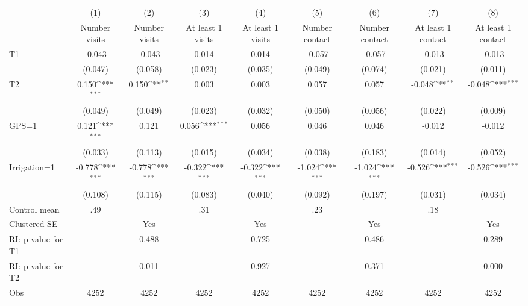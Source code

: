 {
\def\sym#1{\ifmmode^{#1}\else\(^{#1}\)\fi}
\begin{tabular}{l*{8}{c}}
\hline\hline
                    &\multicolumn{1}{c}{(1)}         &\multicolumn{1}{c}{(2)}         &\multicolumn{1}{c}{(3)}         &\multicolumn{1}{c}{(4)}         &\multicolumn{1}{c}{(5)}         &\multicolumn{1}{c}{(6)}         &\multicolumn{1}{c}{(7)}         &\multicolumn{1}{c}{(8)}         \\
                    &Number visits         &Number visits         &At least 1 visits         &At least 1 visits         &Number contact         &Number contact         &At least 1 contact         &At least 1 contact         \\
\hline
T1                  &-0.043         &-0.043         &0.014         &0.014         &-0.057         &-0.057         &-0.013         &-0.013         \\
                    &(0.047)         &(0.058)         &(0.023)         &(0.035)         &(0.049)         &(0.074)         &(0.021)         &(0.011)         \\
T2                  &0.150\sym{***}&0.150\sym{**} &0.003         &0.003         &0.057         &0.057         &-0.048\sym{**} &-0.048\sym{***}\\
                    &(0.049)         &(0.049)         &(0.023)         &(0.032)         &(0.050)         &(0.056)         &(0.022)         &(0.009)         \\
GPS=1               &0.121\sym{***}&0.121         &0.056\sym{***}&0.056         &0.046         &0.046         &-0.012         &-0.012         \\
                    &(0.033)         &(0.113)         &(0.015)         &(0.034)         &(0.038)         &(0.183)         &(0.014)         &(0.052)         \\
Irrigation=1        &-0.778\sym{***}&-0.778\sym{***}&-0.322\sym{***}&-0.322\sym{***}&-1.024\sym{***}&-1.024\sym{***}&-0.526\sym{***}&-0.526\sym{***}\\
                    &(0.108)         &(0.115)         &(0.083)         &(0.040)         &(0.092)         &(0.197)         &(0.031)         &(0.034)         \\
\hline
Control mean        &  .49         &              &  .31         &              &  .23         &              &  .18         &              \\
Clustered SE        &              &  Yes         &              &  Yes         &              &  Yes         &              &  Yes         \\
RI: p-value for T1  &              &0.488         &              &0.725         &              &0.486         &              &0.289         \\
RI: p-value for T2  &              &0.011         &              &0.927         &              &0.371         &              &0.000         \\
Obs                 & 4252         & 4252         & 4252         & 4252         & 4252         & 4252         & 4252         & 4252         \\
\hline\hline
\end{tabular}
}
